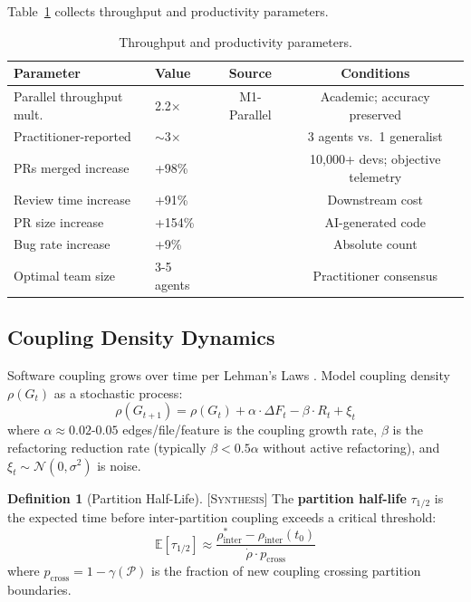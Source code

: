 \documentclass[11pt]{article}
\theoremstyle{definition}
\newtheorem{definition}[theorem]{Definition}
\theoremstyle{remark}
\newcommand{\synthesis}{\textsc{[Synthesis]}}
\begin{document}
Table~\ref{tab:throughput-params} collects throughput and productivity parameters.

\begin{table}[ht]
\centering
\caption{Throughput and productivity parameters.}
\label{tab:throughput-params}
\small
\begin{tabular}{llcc}
\toprule
\textbf{Parameter} & \textbf{Value} & \textbf{Source} & \textbf{Conditions} \\
\midrule
Parallel throughput mult. & 2.2$\times$ & M1-Parallel & Academic; accuracy preserved \\
Practitioner-reported & $\sim$3$\times$ & \citet{Osmani2025} & 3 agents vs.\ 1 generalist \\
PRs merged increase & +98\% & \citet{DORA2025} & 10,000+ devs; objective telemetry \\
Review time increase & +91\% & \citet{DORA2025} & Downstream cost \\
PR size increase & +154\% & \citet{DORA2025} & AI-generated code \\
Bug rate increase & +9\% & \citet{DORA2025} & Absolute count \\
Optimal team size & 3-5 agents & \citet{Osmani2025} & Practitioner consensus \\
\bottomrule
\end{tabular}
\end{table}

\subsection{Coupling Density Dynamics}

Software coupling grows over time per Lehman's Laws \citep{Lehman1980}.
Model coupling density $\rho(G_t)$ as a stochastic process:
\begin{equation}
  \rho(G_{t+1}) = \rho(G_t) + \alpha \cdot \Delta F_t - \beta \cdot R_t + \xi_t
\end{equation}
where $\alpha \approx 0.02$-$0.05$ edges/file/feature is the coupling growth rate, $\beta$ is the refactoring reduction rate (typically $\beta < 0.5\alpha$ without active refactoring), and $\xi_t \sim \mathcal{N}(0, \sigma^2)$ is noise.

\begin{definition}[Partition Half-Life] \synthesis{}
The \textbf{partition half-life} $\tau_{1/2}$ is the expected time before inter-partition coupling exceeds a critical threshold:
\begin{equation}
  \mathbb{E}[\tau_{1/2}] \approx \frac{\rho_{\mathrm{inter}}^* - \rho_{\mathrm{inter}}(t_0)}{\dot{\rho} \cdot p_{\mathrm{cross}}}
\end{equation}
where $p_{\mathrm{cross}} = 1 - \gamma(\mathcal{P})$ is the fraction of new coupling crossing partition boundaries.
\end{definition}
\end{document}
